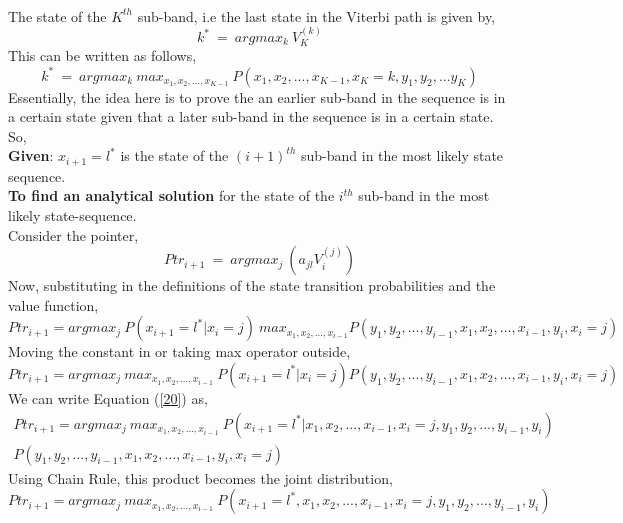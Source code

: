 \documentclass[12pt, draftcls, onecolumn]{IEEEtran}
\begin{document}
\\The state of the $K^{th}$ sub-band, i.e the last state in the Viterbi path is given by,
\begin{equation}\label{17}
    k^*\ =\ argmax_k\ V_K^{(k)}
\end{equation}
This can be written as follows,
\begin{equation}\label{18}
    k^*\ =\ argmax_k\ max_{x_1,x_2,...,x_{K-1}}\ P(x_1,x_2,...,x_{K-1},x_K=k,y_1,y_2,...y_K)
\end{equation}
Essentially, the idea here is to prove the an earlier sub-band in the sequence is in a certain state given that a later sub-band in the sequence is in a certain state.
\\So,
\\\textbf{Given}: $x_{i+1}=l^*$ is the state of the $(i+1)^{th}$ sub-band in the most likely state sequence.
\\\textbf{To find an analytical solution} for the state of the $i^{th}$ sub-band in the most likely state-sequence.
\\Consider the pointer,
\[Ptr_{i+1}\ =\ argmax_j\ (a_{jl}V_{i}^{(j)})\]
Now, substituting in the definitions of the state transition probabilities and the value function,
\begin{equation}\label{19}
    Ptr_{i+1}=argmax_j\ P(x_{i+1}=l^*|x_{i}=j)\ max_{x_1,x_2,...,x_{i-1}}P(y_1,y_2,...,y_{i-1},x_1,x_2,...,x_{i-1},y_i,x_{i}=j)
\end{equation}
Moving the constant in or taking max operator outside,
\begin{equation}\label{20}
    Ptr_{i+1}=argmax_j\ max_{x_1,x_2,...,x_{i-1}}\ P(x_{i+1}=l^*|x_{i}=j)P(y_1,y_2,...,y_{i-1},x_1,x_2,...,x_{i-1},y_i,x_{i}=j)
\end{equation}
We can write Equation (\ref{20}) as,
\begin{equation}\label{21}
    \begin{aligned}
        Ptr_{i+1}=argmax_j\ max_{x_1,x_2,...,x_{i-1}}\ P(x_{i+1}=l^*|x_1,x_2,...,x_{i-1},x_{i}=j,y_1,y_2,...,y_{i-1},y_{i})\\P(y_1,y_2,...,y_{i-1},x_1,x_2,...,x_{i-1},y_i,x_{i}=j)
    \end{aligned}
\end{equation}
Using Chain Rule, this product becomes the joint distribution,
\begin{equation}\label{22}
        Ptr_{i+1}=argmax_j\ max_{x_1,x_2,...,x_{i-1}}\ P(x_{i+1}=l^*,x_1,x_2,...,x_{i-1},x_{i}=j,y_1,y_2,...,y_{i-1},y_{i})
\end{equation}
\end{document}
